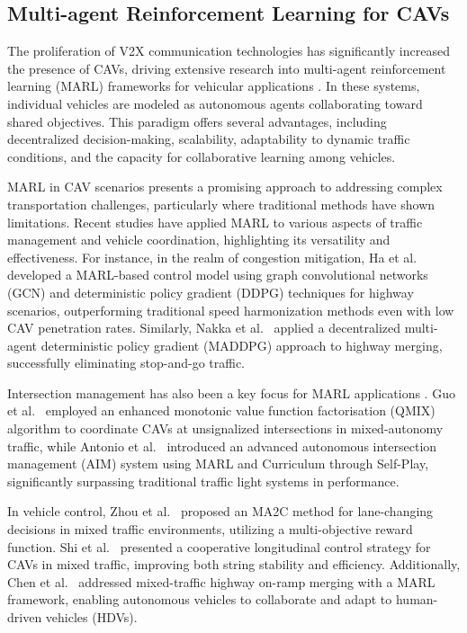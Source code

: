 \subsection{Multi-agent Reinforcement Learning for CAVs}\label{sec:marl_literature}
The proliferation of V2X communication technologies has significantly increased the presence of CAVs, driving extensive research into multi-agent reinforcement learning (MARL) frameworks for vehicular applications \cite{zhou2023survey,henao2023multiclass,liu2023medical,cai2023unsupervised}. In these systems, individual vehicles are modeled as autonomous agents collaborating toward shared objectives. This paradigm offers several advantages, including decentralized decision-making, scalability, adaptability to dynamic traffic conditions, and the capacity for collaborative learning among vehicles.

MARL in CAV scenarios presents a promising approach to addressing complex transportation challenges, particularly where traditional methods have shown limitations. Recent studies have applied MARL to various aspects of traffic management and vehicle coordination, highlighting its versatility and effectiveness. For instance, in the realm of congestion mitigation, Ha et al.~\cite{ha2020leveraging} developed a MARL-based control model using graph convolutional networks (GCN) and deterministic policy gradient (DDPG) techniques for highway scenarios, outperforming traditional speed harmonization methods even with low CAV penetration rates. Similarly, Nakka et al.~\cite{Nakka2022Merging} applied a decentralized multi-agent deterministic policy gradient (MADDPG) approach to highway merging, successfully eliminating stop-and-go traffic.

Intersection management has also been a key focus for MARL applications \cite{you2023rethinking,liu2023benchmarking,yan2024after,han2024hybrid,ma2024segment}. Guo et al.~\cite{guo2022coordination} employed an enhanced monotonic value function factorisation (QMIX) algorithm to coordinate CAVs at unsignalized intersections in mixed-autonomy traffic, while Antonio et al.~\cite{antonio2022multi} introduced an advanced autonomous intersection management (AIM) system using MARL and Curriculum through Self-Play, significantly surpassing traditional traffic light systems in performance.

In vehicle control, Zhou et al.~\cite{zhou2022multi} proposed an MA2C method for lane-changing decisions in mixed traffic environments, utilizing a multi-objective reward function. Shi et al.~\cite{SHI2021Connected} presented a cooperative longitudinal control strategy for CAVs in mixed traffic, improving both string stability and efficiency. Additionally, Chen et al.~\cite{Chen2023OnRamp} addressed mixed-traffic highway on-ramp merging with a MARL framework, enabling autonomous vehicles to collaborate and adapt to human-driven vehicles (HDVs).

